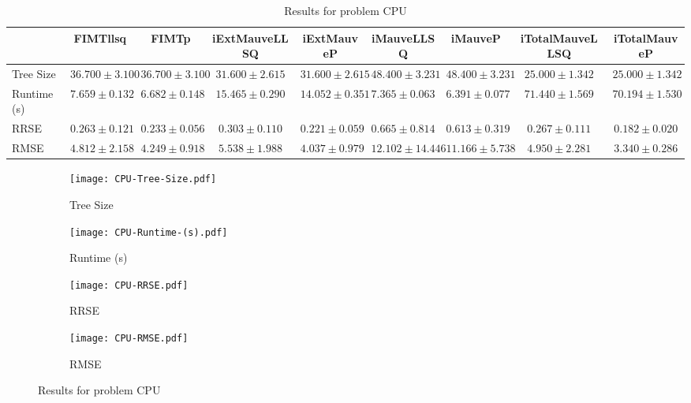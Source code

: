 \documentclass{article}
\begin{document}
\begin{table}[h]
\tiny
\begin{tabular}{|l|c|c|c|c|c|c|c|c|}
\hline
 & FIMTllsq & FIMTp & iExtMauveLLSQ & iExtMauveP & iMauveLLSQ & iMauveP & iTotalMauveLLSQ & iTotalMauveP\\
\hline
Tree Size & $36.700 \pm 3.100$ & $36.700 \pm 3.100$ & $31.600 \pm 2.615$ & $31.600 \pm 2.615$ & $48.400 \pm 3.231$ & $48.400 \pm 3.231$ & \cellcolor{blue!25} $25.000 \pm 1.342$ & \cellcolor{blue!25} $25.000 \pm 1.342$ \\
\hline
Runtime (s) & $7.659 \pm 0.132$ & $6.682 \pm 0.148$ & $15.465 \pm 0.290$ & $14.052 \pm 0.351$ & $7.365 \pm 0.063$ & \cellcolor{blue!25} $6.391 \pm 0.077$ & $71.440 \pm 1.569$ & $70.194 \pm 1.530$ \\
\hline
RRSE & $0.263 \pm 0.121$ & $0.233 \pm 0.056$ & $0.303 \pm 0.110$ & $0.221 \pm 0.059$ & $0.665 \pm 0.814$ & $0.613 \pm 0.319$ & $0.267 \pm 0.111$ & \cellcolor{blue!25} $0.182 \pm 0.020$ \\
\hline
RMSE & $4.812 \pm 2.158$ & $4.249 \pm 0.918$ & $5.538 \pm 1.988$ & $4.037 \pm 0.979$ & $12.102 \pm 14.446$ & $11.166 \pm 5.738$ & $4.950 \pm 2.281$ & \cellcolor{blue!25} $3.340 \pm 0.286$ \\
\hline
\end{tabular}
\caption{Results for problem CPU}
\end{table}
\begin{figure}[h]
\centering
\begin{subfigure}{0.45\textwidth}
  \texttt{[image: CPU-Tree-Size.pdf]}
  \caption{Tree Size}
\end{subfigure}
\begin{subfigure}{0.45\textwidth}
  \texttt{[image: CPU-Runtime-(s).pdf]}
  \caption{Runtime (s)}
\end{subfigure}
\begin{subfigure}{0.45\textwidth}
  \texttt{[image: CPU-RRSE.pdf]}
  \caption{RRSE}
\end{subfigure}
\begin{subfigure}{0.45\textwidth}
  \texttt{[image: CPU-RMSE.pdf]}
  \caption{RMSE}
\end{subfigure}
\caption{Results for problem CPU}
\end{figure}
\end{document}
